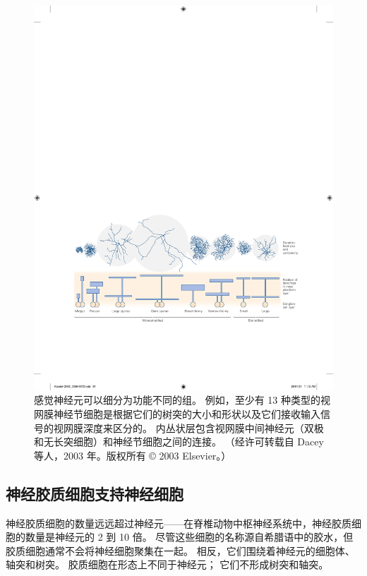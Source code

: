 \begin{figure}[htbp]
	\centering
	\includegraphics[width=1.0\linewidth]{chap03/fig_3_4}
	\caption{感觉神经元可以细分为功能不同的组。 
		例如，至少有 13 种类型的视网膜神经节细胞是根据它们的树突的大小和形状以及它们接收输入信号的视网膜深度来区分的。 
		内丛状层包含视网膜中间神经元（双极和无长突细胞）和神经节细胞之间的连接。 
		（经许可转载自 Dacey 等人，2003 年。版权所有 © 2003 Elsevier。）}
	\label{fig:3_4}
\end{figure}


\subsection{神经胶质细胞支持神经细胞}
神经胶质细胞的数量远远超过神经元——在脊椎动物中枢神经系统中，神经胶质细胞的数量是神经元的 2 到 10 倍。 
尽管这些细胞的名称源自希腊语中的胶水，但胶质细胞通常不会将神经细胞聚集在一起。 
相反，它们围绕着神经元的细胞体、轴突和树突。 
胶质细胞在形态上不同于神经元； 它们不形成树突和轴突。


